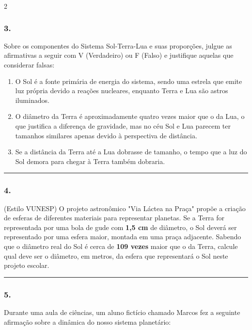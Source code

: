 \documentclass[twoside, 10pt, a4paper]{article}
\newlength{\espacoPreQuestao}\setlength{\espacoPreQuestao}{0.1cm}
\newlength{\espacoQuestao}\setlength{\espacoQuestao}{0.2cm}
\newlength{\espacoAlt}\setlength{\espacoAlt}{0.2cm}
\begin{document}
\begin{multicols*}{2}
\subsubsection*{3.} Sobre os componentes do Sistema Sol-Terra-Lua e suas proporções, julgue as afirmativas a seguir com V (Verdadeiro) ou F (Falso) e justifique aquelas que considerar falsas:
\begin{enumerate}[label=\Roman*., itemsep=\espacoAlt]
    \item O Sol é a fonte primária de energia do sistema, sendo uma estrela que emite luz própria devido a reações nucleares, enquanto Terra e Lua são astros iluminados.
    \item O diâmetro da Terra é aproximadamente quatro vezes maior que o da Lua, o que justifica a diferença de gravidade, mas no céu Sol e Lua parecem ter tamanhos similares apenas devido à perspectiva de distância.
    \item Se a distância da Terra até a Lua dobrasse de tamanho, o tempo que a luz do Sol demora para chegar à Terra também dobraria.
\end{enumerate}
\par\vspace{\espacoQuestao}

\noindent\textcolor{CorLinha}{\rule{\linewidth}{0.5pt}} 
\par\vspace{\espacoPreQuestao}
\subsubsection*{4.} (Estilo VUNESP) O projeto astronômico "Via Láctea na Praça" propõe a criação de esferas de diferentes materiais para representar planetas. Se a Terra for representada por uma bola de gude com \textbf{1,5 cm} de diâmetro, o Sol deverá ser representado por uma esfera maior, montada em uma praça adjacente. Sabendo que o diâmetro real do Sol é cerca de \textbf{109 vezes} maior que o da Terra, calcule qual deve ser o diâmetro, em metros, da esfera que representará o Sol neste projeto escolar.
\par\vspace{\espacoQuestao}

\noindent\textcolor{CorLinha}{\rule{\linewidth}{0.5pt}} 
\par\vspace{\espacoPreQuestao}
\subsubsection*{5.} Durante uma aula de ciências, um aluno fictício chamado Marcos fez a seguinte afirmação sobre a dinâmica do nosso sistema planetário: 


\end{multicols*}
\end{document}
